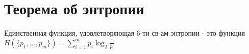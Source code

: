 \documentclass[discrete.tex]{subfiles}
\begin{document}
\section{Теорема об энтропии}
\begin{theorem}
  Единственная функция, удовлетворяющая 6-ти св-ам энтропии - это функция $H(\{p_1,...,p_m\}) = \sum_{i=1}^m p_i \log_2 \frac{1}{p_i}$
\end{theorem}
\end{document}
